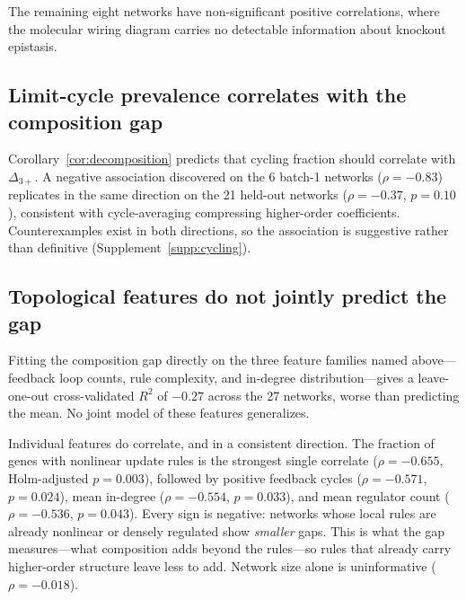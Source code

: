 \documentclass[10pt]{article}
\begin{document}
The remaining eight networks have non-significant positive
correlations, where the molecular wiring diagram carries no detectable
information about knockout epistasis.


\subsection{Limit-cycle prevalence correlates with the composition gap}
\label{sec:cycling}

Corollary~\ref{cor:decomposition} predicts that cycling fraction
should correlate with $\Delta_{3+}$. A negative association
discovered on the 6 batch-1 networks ($\rho = -0.83$) replicates in
the same direction on the 21 held-out networks ($\rho = -0.37$,
$p = 0.10$), consistent with cycle-averaging compressing
higher-order coefficients. Counterexamples exist in both directions,
so the association is suggestive rather than definitive
(Supplement~\ref{supp:cycling}).


\subsection{Topological features do not jointly predict the gap}
\label{sec:blind-results}

Fitting the composition gap directly on the three feature families
named above---feedback loop counts, rule complexity, and in-degree
distribution---gives a leave-one-out cross-validated $R^2$ of $-0.27$
across the 27 networks, worse than predicting the mean. No joint model
of these features generalizes.

Individual features do correlate, and in a consistent direction. The
fraction of genes with nonlinear update rules is the strongest single
correlate ($\rho = -0.655$, Holm-adjusted $p = 0.003$), followed by
positive feedback cycles ($\rho = -0.571$, $p = 0.024$), mean
in-degree ($\rho = -0.554$, $p = 0.033$), and mean regulator count
($\rho = -0.536$, $p = 0.043$). Every sign is negative: networks whose
local rules are already nonlinear or densely regulated show
\emph{smaller} gaps. This is what the gap measures---what composition
adds beyond the rules---so rules that already carry higher-order
structure leave less to add. Network size alone is uninformative
($\rho = -0.018$).
\end{document}

